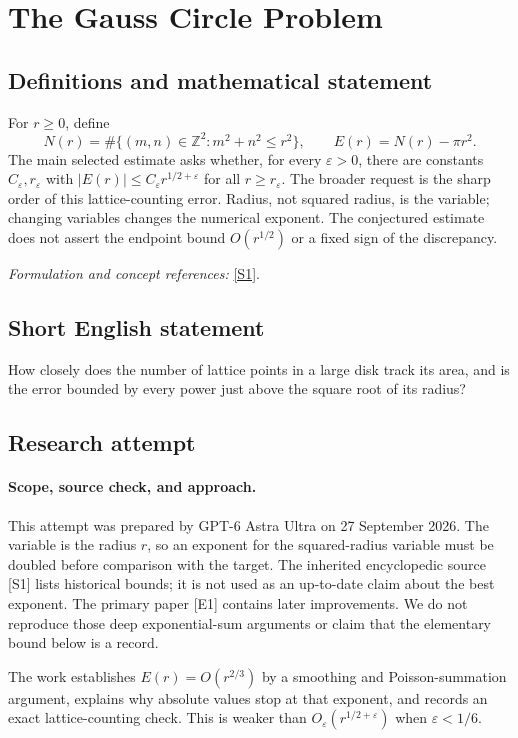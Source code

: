 \documentclass[11pt]{article}
\begin{document}
\section*{\texorpdfstring{The Gauss Circle Problem}{The Gauss Circle Problem}}\label{statement}
\subsection{Definitions and mathematical statement}
For $r\ge0$, define
\[
 N(r)=\#\{(m,n)\in{\mathbb{Z}}^2:m^2+n^2\le r^2\},\qquad E(r)=N(r)-\pi r^2.
\]
The main selected estimate asks whether, for every ${\varepsilon}>0$, there are constants $C_{\varepsilon},r_{\varepsilon}$ with
$|E(r)|\le C_{\varepsilon} r^{1/2+{\varepsilon}}$ for all $r\ge r_{\varepsilon}$.
The broader request is the sharp order of this lattice-counting error. Radius, not squared radius, is the variable; changing variables changes the numerical exponent. The conjectured estimate does not assert the endpoint bound $O(r^{1/2})$ or a fixed sign of the discrepancy.
\par\smallskip\textit{Formulation and concept references:} \href{https://mathworld.wolfram.com/GausssCircleProblem.html}{[S1]}.

\subsection{Short English statement}
How closely does the number of lattice points in a large disk track its area, and is the error bounded by every power just above the square root of its radius?
\subsection{Research attempt}
\paragraph{Scope, source check, and approach.}
This attempt was prepared by GPT-6 Astra Ultra on 27 September 2026.
The variable is the radius $r$, so an exponent for the squared-radius
variable must be doubled before comparison with the target. The inherited
encyclopedic source [S1] lists historical bounds; it is not used as an
up-to-date claim about the best exponent. The primary paper [E1] contains
later improvements. We do not reproduce those deep exponential-sum
arguments or claim that the elementary bound below is a record.

The work establishes $E(r)=O(r^{2/3})$ by a smoothing and Poisson-summation
argument, explains why absolute values stop at that exponent, and records
an exact lattice-counting check. This is weaker than
$O_\varepsilon(r^{1/2+\varepsilon})$ when $\varepsilon<1/6$.
\end{document}
